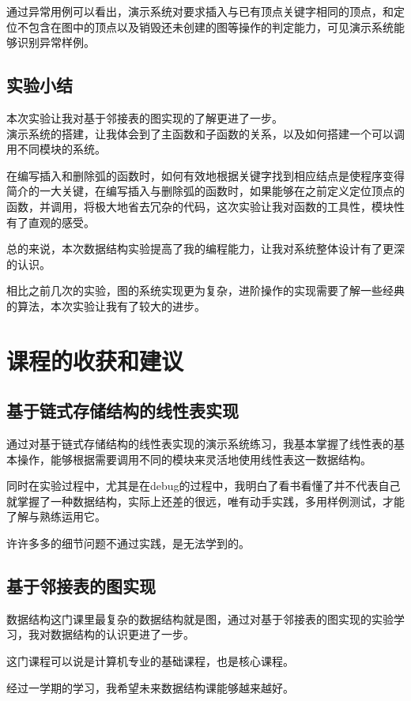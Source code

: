 \documentclass[supercite]{Experimental_Report}
\theoremstyle{definition}
\begin{document}
通过异常用例可以看出，演示系统对要求插入与已有顶点关键字相同的顶点，和定位不包含在图中的顶点以及销毁还未创建的图等操作的判定能力，可见演示系统能够识别异常样例。
\clearpage
\subsection{实验小结}
本次实验让我对基于邻接表的图实现的了解更进了一步。\\
演示系统的搭建，让我体会到了主函数和子函数的关系，以及如何搭建一个可以调用不同模块的系统。\par
在编写插入和删除弧的函数时，如何有效地根据关键字找到相应结点是使程序变得简介的一大关键，在编写插入与删除弧的函数时，如果能够在之前定义定位顶点的函数，并调用，将极大地省去冗杂的代码，这次实验让我对函数的工具性，模块性有了直观的感受。\par
总的来说，本次数据结构实验提高了我的编程能力，让我对系统整体设计有了更深的认识。\par
相比之前几次的实验，图的系统实现更为复杂，进阶操作的实现需要了解一些经典的算法，本次实验让我有了较大的进步。
\clearpage
\section{课程的收获和建议}
\subsection{基于链式存储结构的线性表实现}
通过对基于链式存储结构的线性表实现的演示系统练习，我基本掌握了线性表的基本操作，能够根据需要调用不同的模块来灵活地使用线性表这一数据结构。\par
同时在实验过程中，尤其是在debug的过程中，我明白了看书看懂了并不代表自己就掌握了一种数据结构，实际上还差的很远，唯有动手实践，多用样例测试，才能了解与熟练运用它。\par
许许多多的细节问题不通过实践，是无法学到的。
\subsection{基于邻接表的图实现}
数据结构这门课里最复杂的数据结构就是图，通过对基于邻接表的图实现的实验学习，我对数据结构的认识更进了一步。\par
这门课程可以说是计算机专业的基础课程，也是核心课程。\par
经过一学期的学习，我希望未来数据结构课能够越来越好。\par
\nocite{*} %



\setcounter{secnumdepth}{0}
\appendix
\end{document}
